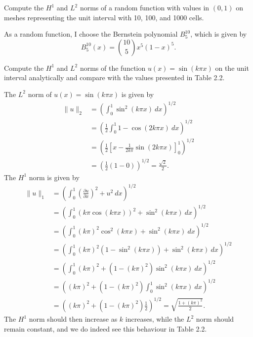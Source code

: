 \begin{exercise}
    Compute the $H^1$ and $L^2$ norms of a random function with values in $(0, 1)$ on meshes representing the unit interval with 10, 100, and 1000 cells.
\end{exercise}

\begin{solution}
    As a random function, I choose the Bernstein polynomial $B_{5}^{10}$, which is given by
    \begin{equation*}
        B_{5}^{10}(x) = \binom{10}{5} x^5 (1 - x)^5.
    \end{equation*}
\end{solution}

\begin{exercise}
    Compute the $H^1$ and $L^2$ norms of the function $u(x) = \sin(k\pi x)$ on the unit interval analytically and compare with the values presented in Table 2.2.
\end{exercise}

\begin{solution}
    The $L^2$ norm of $u(x) = \sin(k\pi x)$ is given by
    \begin{align*}
        \lVert u \rVert_2 &=\left( \int_{0}^{1} \sin^2(k\pi x) \ dx \right)^{1/2} \\
        &=\left( \frac{1}{2} \int_{0}^{1} 1 - \cos(2k\pi x) \ dx \right)^{1/2} \\
        &=\left( \frac{1}{2} \left[ x - \frac{1}{2k\pi} \sin(2k\pi x) \right]_0^1 \right)^{1/2} \\
        &=\left( \frac{1}{2} \left( 1 - 0 \right) \right)^{1/2}
        = \frac{\sqrt{2}}{2}.
    \end{align*}
    The $H^1$ norm is given by
    \begin{align*}
        \lVert u \rVert_1 &= \left( \int_{0}^{1} \left( \frac{\partial u}{\partial x} \right)^2 + u^2 \ dx \right)^{1/2} \\
        &= \left( \int_{0}^{1} \left( k\pi \cos(k\pi x) \right)^2 + \sin^2(k\pi x) \ dx \right)^{1/2} \\
        &= \left( \int_{0}^{1} (k\pi)^2 \cos^2(k\pi x) + \sin^2(k\pi x) \ dx \right)^{1/2} \\
        &= \left( \int_{0}^{1} (k\pi)^2 \left( 1 - \sin^2(k\pi x) \right) + \sin^2(k\pi x) \ dx \right)^{1/2} \\
        &= \left( \int_{0}^{1} (k\pi)^2 + (1 - (k\pi)^2) \sin^2(k\pi x) \ dx \right)^{1/2} \\
        &= \left( (k\pi)^2 + (1 - (k\pi)^2) \int_{0}^{1} \sin^2(k\pi x) \ dx \right)^{1/2} \\
        &= \left( (k\pi)^2 + (1 - (k\pi)^2) \frac{1}{2} \right)^{1/2}
        = \sqrt{\frac{1 + (k\pi)^2}{2}}.
    \end{align*}
    The $H^1$ norm should then increase as $k$ increases, while the $L^2$ norm should remain constant, and we do indeed see this behaviour in Table 2.2.
\end{solution}

